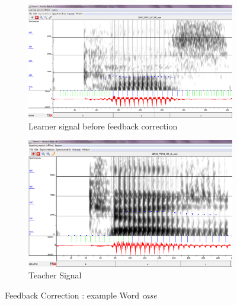 \documentclass[11pt]{beamer}
\begin{document}
\begin{frame}

\begin{figure}
\begin{subfigure}{.5\textwidth}
  \centering
  \includegraphics[width=0.9\linewidth]{images/case_learner.PNG}
  \caption{Learner signal before feedback correction}
  \label{fig:sfig1}
\end{subfigure}%
\begin{subfigure}{.5\textwidth}
  \centering
  \includegraphics[width=0.87\linewidth]{images/teacher_case.PNG}
  \caption{Teacher Signal}
  \label{fig:sfig2}
\end{subfigure}
\caption{Feedback Correction : example Word \emph{case}}
\label{fig:fig}
\end{figure}
\end{frame}
\end{document}
